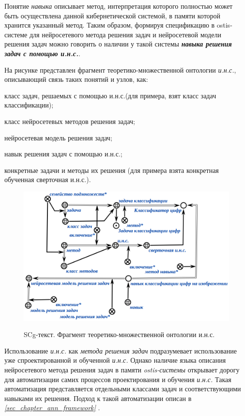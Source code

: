 Понятие \textit{навыка} описывает метод, интерпретация которого полностью может быть осуществлена данной кибернетической системой, в памяти которой хранится указанный метод. Таким образом, формируя спецификацию в ostis-системе для нейросетевого метода решения задач и нейросетевой модели решения задач можно говорить о наличии у такой системы \textbf{\textit{навыка решения задач с помощью и.н.с.}}.

На рисунке \textit{} представлен фрагмент теоретико-множественной онтологии \textit{и.н.с.}, описывающий связь таких понятий и узлов, как:
\begin{textitemize}
	\item класс задач, решаемых с помощью и.н.с.(для примера, взят класс задач классификации);
	\item класс нейросетевых методов решения задач;
	\item нейросетевая модель решения задач;
	\item навык решения задач с помощью и.н.с.;
	\item конкретные задачи и методы их решения (для примера взята конкретная обученная сверточная и.н.с.).
\end{textitemize}

\begin{figure}[H]
	\caption{SCg-текст. Фрагмент теоретико-множественной онтологии и.н.с.}
	\includegraphics[scale=0.5]{author/part3/figures/actions_concepts.png}
	\label{fig:actions_concepts}
\end{figure}

Использование \textit{и.н.с.} как\textit{ метода решения задач} подразумевает использование уже спроектированной и обученной \textit{и.н.с.} Однако наличие языка описания нейросетевого метода решения задач в памяти \textit{ostis-системы} открывает дорогу для автоматизации самих процессов проектирования и обучения \textit{и.н.с.} Такая автоматизация представляется отдельными классами задач и соответствующими навыками их решения. Подход к такой автоматизации описан в \textit{\ref{sec_chapter_ann_framework} }.

